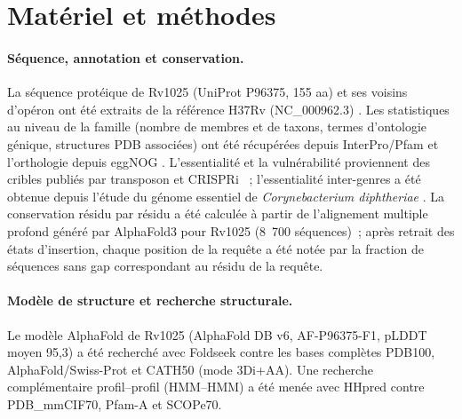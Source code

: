 \documentclass[11pt,a4paper]{article}
\begin{document}
\section{Matériel et méthodes}

\paragraph{Séquence, annotation et conservation.} La séquence protéique de Rv1025 (UniProt P96375, 155 aa) et ses voisins d'opéron ont été extraits de la référence H37Rv (NC\_000962.3) \citep{cole1998genome}. Les statistiques au niveau de la famille (nombre de membres et de taxons, termes d'ontologie génique, structures PDB associées) ont été récupérées depuis InterPro/Pfam \citep{paysanlafosse2023interpro} et l'orthologie depuis eggNOG \citep{huertacepas2019eggnog}. L'essentialité et la vulnérabilité proviennent des cribles publiés par transposon \citep{dejesus2017essentiality} et CRISPRi \citep{bosch2021vulnerability}~; l'essentialité inter-genres a été obtenue depuis l'étude du génome essentiel de \textit{Corynebacterium diphtheriae} \citep{goodall2023diphtheriae}. La conservation résidu par résidu a été calculée à partir de l'alignement multiple profond généré par AlphaFold3 pour Rv1025 (8~700 séquences)~; après retrait des états d'insertion, chaque position de la requête a été notée par la fraction de séquences sans gap correspondant au résidu de la requête.

\paragraph{Modèle de structure et recherche structurale.} Le modèle AlphaFold de Rv1025 (AlphaFold DB v6, AF-P96375-F1, pLDDT moyen 95,3) \citep{jumper2021alphafold,varadi2022afdb} a été recherché avec Foldseek \citep{vankempen2024foldseek} contre les bases complètes PDB100, AlphaFold/Swiss-Prot et CATH50 (mode 3Di+AA). Une recherche complémentaire profil--profil (HMM--HMM) a été menée avec HHpred \citep{zimmermann2018hhpred} contre PDB\_mmCIF70, Pfam-A et SCOPe70.
\end{document}
